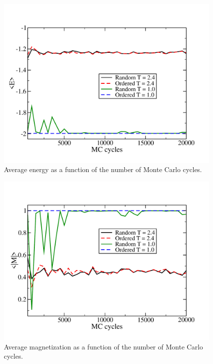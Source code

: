 \documentclass[prc,amsmath,twocolumn,superscriptaddress]{revtex4}
\begin{document}
\begin{figure}[t]
\includegraphics[scale=0.33]{energy_mc.pdf}
\caption{Average energy as a function of the number of Monte Carlo cycles.}
\label{E_mc}
\end{figure}

\begin{figure}[b]
\includegraphics[scale=0.33]{mag_mc.pdf}
\caption{Average magnetization as a function of the number of Monte Carlo cycles.}
\label{M_mc}
\end{figure}
\end{document}
